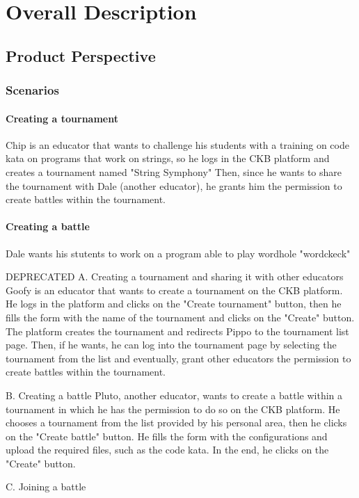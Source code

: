 \chapter{Overall Description}
\section{Product Perspective}
\subsection{Scenarios}

\subsubsection{Creating a tournament}
Chip is an educator that wants to challenge his students with a training on code kata on programs that work on strings, so he logs in the CKB platform and creates a tournament named "String Symphony"
Then, since he wants to share the tournament with Dale (another educator), he grants him the permission to create battles within the tournament.

\subsubsection{Creating a battle}
Dale wants his stutents to work on a program able to play wordhole "wordckeck"

DEPRECATED
A. Creating a tournament and sharing it with other educators
    Goofy is an educator that wants to create a tournament on the CKB platform. 
    He logs in the platform and clicks on the "Create tournament" button, then he fills the form with the name of the tournament and clicks on the "Create" button.
    The platform creates the tournament and redirects Pippo to the tournament list page.
    Then, if he wants, he can log into the tournament page by selecting the tournament from the list and eventually, grant other educators the permission to create battles within the tournament.

B. Creating a battle
    Pluto, another educator, wants to create a battle within a tournament in which he has the permission to do so on the CKB platform.
    He chooses a tournament from the list provided by his personal area, then he clicks on the "Create battle" button.
    He fills the form with the configurations and upload the required files, such as the code kata.
    In the end, he clicks on the "Create" button.

C. Joining a battle
